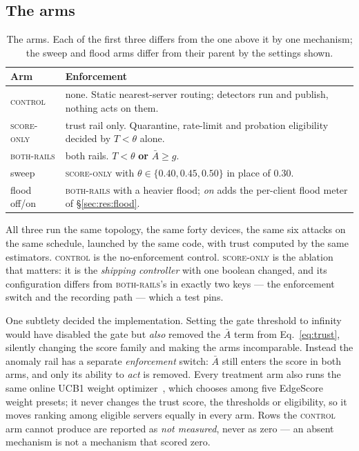 \documentclass[10pt,twocolumn,letterpaper]{article}
\newcommand{\Tscore}{T}
\newcommand{\Agate}{\bar{A}}
\newcommand{\armbase}{\textsc{control}}
\newcommand{\armscore}{\textsc{score-only}}
\newcommand{\armfull}{\textsc{both-rails}}
\begin{document}
\subsection{The arms}
\label{sec:method:arms}

\begin{table}[t]
\caption{The arms. Each of the first three differs from the one above it by
one mechanism; the sweep and flood arms differ from their parent by the settings
shown.}
\label{tab:arms}
\centering\footnotesize
\begin{tabularx}{\columnwidth}{@{}lX@{}}
\toprule
\textbf{Arm} & \textbf{Enforcement}\\
\midrule
\armbase{}  & none. Static nearest-server routing; detectors run and publish,
              nothing acts on them.\\
\armscore{} & trust rail only. Quarantine, rate-limit and probation
              eligibility decided by $\Tscore < \theta$ alone.\\
\armfull{}  & both rails. $\Tscore < \theta$ \textbf{or} $\Agate \ge g$.\\
\midrule
sweep      & \armscore{} with $\theta \in \{0.40, 0.45, 0.50\}$ in place of $0.30$.\\
flood off/on & \armfull{} with a heavier flood; \emph{on} adds the per-client
              flood meter of \S\ref{sec:res:flood}.\\
\bottomrule
\end{tabularx}
\end{table}

All three run the same topology, the same forty devices, the same six attacks
on the same schedule, launched by the same code, with trust computed by the
same estimators. \armbase{} is the no-enforcement control. \armscore{} is the
ablation that matters: it is the \emph{shipping controller} with one boolean
changed, and its configuration differs from \armfull{}'s in exactly two keys
--- the enforcement switch and the recording path --- which a test pins.

One subtlety decided the implementation. Setting the gate threshold to infinity
would have disabled the gate but \emph{also} removed the $\Agate$ term from
Eq.~\ref{eq:trust}, silently changing the score family and making the arms
incomparable. Instead the anomaly rail has a separate \emph{enforcement}
switch: $\Agate$ still enters the score in both arms, and only its ability to
\emph{act} is removed. Every treatment arm also runs the same online UCB1
weight optimizer~\cite{auer2002ucb1}, which chooses among five EdgeScore weight
presets; it never changes the trust score, the thresholds or eligibility, so it
moves ranking among eligible servers equally in every arm. Rows the \armbase{}
arm cannot produce are reported as
\emph{not measured}, never as zero --- an absent mechanism is not a mechanism
that scored zero.
\end{document}
